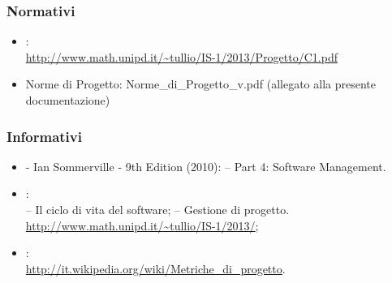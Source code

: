 \subsubsection{Normativi}
\label{3.4.1}
\begin{itemize}
\item {}:\\ \url{http://www.math.unipd.it/~tullio/IS-1/2013/Progetto/C1.pdf}
\item Norme di Progetto: Norme\_{}di\_{}Progetto\_{}v\versioneNormeDiProgetto{}.pdf  (allegato alla presente documentazione)\\
\end{itemize}

\subsubsection{Informativi}
\label{3.4.2}
\begin{itemize}
\item {} - Ian Sommerville - 9th Edition (2010): 
– Part 4: Software Management.
\item {}:\\
– Il ciclo di vita del software;
– Gestione di progetto.\\
\url{http://www.math.unipd.it/~tullio/IS-1/2013/};
\item {}:\\
\url{http://it.wikipedia.org/wiki/Metriche_di_progetto}.
\end{itemize}

